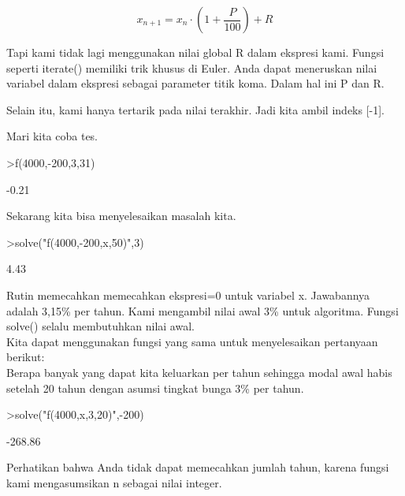 \documentclass[a4paper,10pt]{article}
\begin{document}
\begin{eulernotebook}
\begin{eulercomment}
\begin{eulercomment}
\begin{eulercomment}
\begin{eulercomment}
\begin{eulercomment}
\begin{eulercomment}
\begin{eulercomment}
\end{eulercomment}
\begin{eulerformula}
\[
x_{n+1} = x_n \cdot \left(1+ \frac{P}{100}\right) + R
\]
\end{eulerformula}
\begin{eulercomment}
Tapi kami tidak lagi menggunakan nilai global R dalam ekspresi kami.
Fungsi seperti iterate() memiliki trik khusus di Euler. Anda dapat
meneruskan nilai variabel dalam ekspresi sebagai parameter titik koma.
Dalam hal ini P dan R.

Selain itu, kami hanya tertarik pada nilai terakhir. Jadi kita ambil
indeks [-1].

Mari kita coba tes.
\end{eulercomment}
\begin{eulerprompt}
>f(4000,-200,3,31)
\end{eulerprompt}
\begin{euleroutput}
        -0.21 
\end{euleroutput}
\begin{eulercomment}
Sekarang kita bisa menyelesaikan masalah kita.
\end{eulercomment}
\begin{eulerprompt}
>solve("f(4000,-200,x,50)",3)
\end{eulerprompt}
\begin{euleroutput}
         4.43 
\end{euleroutput}
\begin{eulercomment}
Rutin memecahkan memecahkan ekspresi=0 untuk variabel x. Jawabannya
adalah 3,15\% per tahun. Kami mengambil nilai awal 3\% untuk algoritma.
Fungsi solve() selalu membutuhkan nilai awal.\\
Kita dapat menggunakan fungsi yang sama untuk menyelesaikan pertanyaan
berikut: \\
Berapa banyak yang dapat kita keluarkan per tahun sehingga modal awal
habis setelah 20 tahun dengan asumsi tingkat bunga 3\% per tahun.
\end{eulercomment}
\begin{eulerprompt}
>solve("f(4000,x,3,20)",-200)
\end{eulerprompt}
\begin{euleroutput}
      -268.86 
\end{euleroutput}
\begin{eulercomment}
Perhatikan bahwa Anda tidak dapat memecahkan jumlah tahun, karena
fungsi kami mengasumsikan n sebagai nilai integer.


\end{eulercomment}
\end{eulercomment}
\end{eulercomment}
\end{eulercomment}
\end{eulercomment}
\end{eulercomment}
\end{eulercomment}
\end{eulernotebook}
\end{document}
